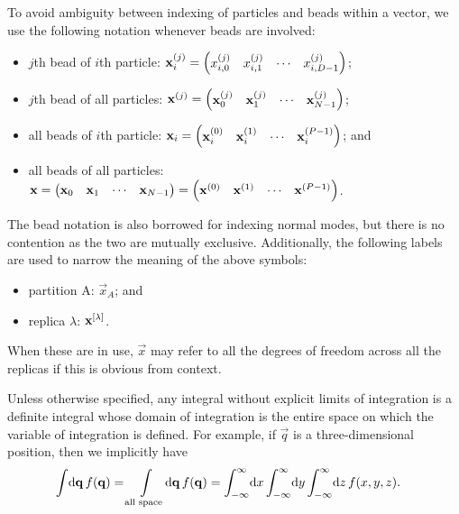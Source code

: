 To avoid ambiguity between indexing of particles and beads within a vector, we use the following notation whenever beads are involved:
\begin{itemize}
	\item $j$th bead of $i$th particle: $\bm{\mathbf{x}}_i^{(j)} = \begin{pmatrix} x_{i,0}^{(j)} & x_{i,1}^{(j)} & \cdots & x_{i,D-1}^{(j)} \end{pmatrix}$;
	\item $j$th bead of all particles: $\bm{\mathbf{x}}^{(j)} = \begin{pmatrix} \bm{\mathbf{x}}_0^{(j)} & \bm{\mathbf{x}}_1^{(j)} & \cdots & \bm{\mathbf{x}}_{N-1}^{(j)} \end{pmatrix}$;
	\item all beads of $i$th particle: $\bm{\mathbf{x}}_i = \begin{pmatrix} \bm{\mathbf{x}}_i^{(0)} & \bm{\mathbf{x}}_i^{(1)} & \cdots & \bm{\mathbf{x}}_i^{(P-1)} \end{pmatrix}$; and
	\item all beads of all particles: $\bm{\mathbf{x}} = \begin{pmatrix} \bm{\mathbf{x}}_0 & \bm{\mathbf{x}}_1 & \cdots & \bm{\mathbf{x}}_{N-1} \end{pmatrix} = \begin{pmatrix} \bm{\mathbf{x}}^{(0)} & \bm{\mathbf{x}}^{(1)} & \cdots & \bm{\mathbf{x}}^{(P-1)} \end{pmatrix}$.
\end{itemize}
The bead notation is also borrowed for indexing normal modes, but there is no contention as the two are mutually exclusive.
Additionally, the following labels are used to narrow the meaning of the above symbols:
\begin{itemize}
	\item partition A: $\vec{x}_A$; and
	\item replica $\lambda$: $\bm{\mathbf{x}}^{[\lambda]}$.
\end{itemize}
When these are in use, $\vec{x}$ may refer to all the degrees of freedom across all the replicas if this is obvious from context.

Unless otherwise specified, any integral without explicit limits of integration is a definite integral whose domain of integration is the entire space on which the variable of integration is defined.
For example, if $\vec{q}$ is a three-dimensional position, then we implicitly have
\begin{align}
	\int\! \dif \vec{q} \, f(\vec{q})
	&= \int\limits_\text{all space}\! \dif \vec{q} \, f(\vec{q})
	= \int_{-\infty}^\infty\! \dif x \int_{-\infty}^\infty\! \dif y \int_{-\infty}^\infty\! \dif z \, f(x, y, z).
\end{align}

